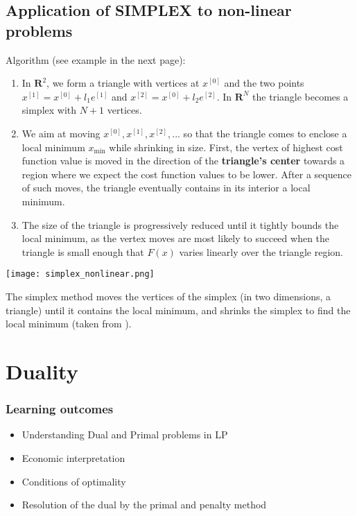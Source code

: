 \documentclass[c]{beamer}
\begin{document}
\subsection{Application of SIMPLEX to non-linear problems}


\begin{frame}
  Algorithm (see example in the next page):
\begin{enumerate}
\item In $\mathbf{R}^2$, we form a triangle with vertices at $x^{[0]}$ and the two points $x^{[1]} = x^{[0]} + l_1e^{[1]}$ and  $x^{[2]} = x^{[0]} + l_2e^{[2]}$. In $\mathbf{R}^N$ the triangle becomes a simplex with $N + 1$ vertices.
\item We aim at moving ${x^{[0]}, x^{[1]}, x^{[2]},...}$ so that the triangle comes to enclose a local minimum $x_{\mathrm{min}}$ while shrinking in size.  First, the vertex of highest cost function value is moved in the direction of the {\bf triangle’s center} towards a region where we expect the cost function values to be lower. After a sequence of such moves, the triangle eventually contains in its interior a local minimum. 
\item The size of the triangle is progressively reduced until it tightly bounds the local minimum, as the vertex moves are most likely to succeed when the triangle is small enough that $F(x)$ varies linearly over the triangle region.
\end{enumerate}
\end{frame}

\begin{frame}
  \begin{center}
    \texttt{[image: simplex\_nonlinear.png]}
  \end{center}
  The simplex method moves the vertices of the simplex (in two dimensions, a triangle) until it contains the local minimum, and shrinks the simplex to find the local minimum (taken from \cite{beers}).
\end{frame}

\section{Duality}


\begin{frame}
\frametitle{Learning outcomes}
\begin{itemize}
  \item Understanding Dual and Primal problems in LP
  \item Economic interpretation
  \item Conditions of optimality
  \item Resolution of the dual by the primal and penalty method
\end{itemize}
\end{frame}
\end{document}
